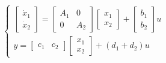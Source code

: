 \[
    \begin{cases}
        \left[\begin{matrix}
            \dot{x}_1\\\dot{x}_2
        \end{matrix}\right] = \left[\begin{matrix}
            A_1 & 0 \\ 0 & A_2
        \end{matrix}\right] \left[\begin{matrix}
            x_1\\x_2
        \end{matrix}\right] + \left[\begin{matrix}
            b_1 \\b_2 
        \end{matrix}\right] u\\
        y = \left[\begin{matrix}
            c_1 & c_2
        \end{matrix}\right] \left[\begin{matrix}
            x_1\\x_2
        \end{matrix}\right] + (d_1 + d_2) u
    \end{cases}
\]

